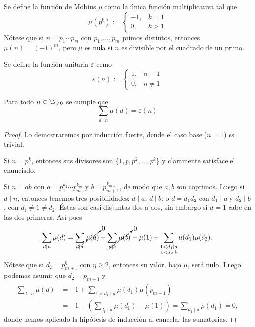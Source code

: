 \documentclass[teoria-numeros.tex]{subfiles}
\begin{document}
\begin{mydef}
	Se define la función de Möbius $\mu$ como la única función multiplicativa tal que
	$$ \mu(p^k) :=
	\begin{cases}
		-1, &k = 1 \\
		0, &k > 1
	\end{cases} $$
	Nótese que si $n = p_1 \cdots p_m$ con $p_1, \dots, p_m$ primos distintos, entonces $\mu(n) = (-1)^m$, pero
	$\mu$ es nula si $n$ es divisible por el cuadrado de un primo.

	Se define la función unitaria $\varepsilon$ como
	$$ \varepsilon(n) :=
	\begin{cases}
		1, &n = 1\\
		0, &n\ne1
	\end{cases} $$
\end{mydef}

\begin{prop}\label{thm:moebius_inversion}
	Para todo $n\in\N_{\ne 0}$ se cumple que
	$$ \sum_{d \mid n} \mu(d) = \varepsilon(n) $$
\end{prop}
\begin{proof}
	Lo demostraremos por inducción fuerte, donde el caso base ($n=1$) es trivial.
	\par
	Si $n = p^k$, entonces sus divisores son $\{1, p, p^2, \dots, p^k\}$ y claramente satisface el enunciado.
	\par
	Si $n = ab$ con $a = p_1^{k_1} \cdots p_m^{k_m}$ y $b = p_{m+1}^{k_{m+1}}$,
	de modo que $a,b$ son coprimos.
	Luego si $d \mid n$, entonces tenemos tres posibilidades: $d\mid a$; $d\mid b$; o $d = d_1d_2$ con $d_1\mid a$ y $d_2\mid b$, con $d_1\ne 1\ne d_2$.
	Éstas son casi disjuntas dos a dos, sin embargo si $d = 1$ cabe en las dos primeras. Así pues
	$$ \sum_{d\mid n} \mu(d) = \cancelto{0}{ \sum_{d\mid a} \mu(d) } + \cancelto{0}{ \sum_{d\mid b} \mu(b) } - \mu(1)
	+ \sum_{\substack{ 1<d_1\mid a \\ 1<d_2\mid b }} \mu(d_1)\mu(d_2). $$
	Nótese que si $d_2 = p_{m+1}^\eta$ con $\eta \ge 2$, entonces su valor, bajo $\mu$, será nulo.
	Luego podemos asumir que $d_2 = p_{m+1}$ y
	\begin{align*}
		\sum_{d\mid n} \mu(d) &= -1 + \sum_{1 < d_1\mid a} \mu(d_1)\mu(p_{m+1}) \\
		&= -1 - \left( \sum_{d_1\mid a} \mu(d_1) - \mu(1) \right) = \sum_{d_1\mid a} \mu(d_1) = 0,
	\end{align*}
	donde hemos aplicado la hipótesis de inducción al cancelar las sumatorias.
\end{proof}
\end{document}
